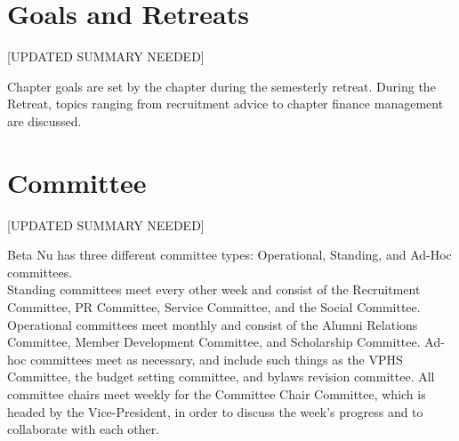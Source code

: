     \section*{Goals and Retreats}
	[UPDATED SUMMARY NEEDED]
	
	Chapter goals are set by the chapter during the semesterly retreat. During the Retreat, topics ranging from recruitment advice to chapter finance management are discussed.
	
    \section*{Committee}
	[UPDATED SUMMARY NEEDED]
    
	Beta Nu has three different committee types: Operational, Standing, and Ad-Hoc committees. \\
	
	Standing committees meet every other week and consist of the Recruitment Committee, PR Committee, Service Committee, and the Social Committee. Operational committees meet monthly and consist of the Alumni Relations Committee, Member Development Committee, and Scholarship Committee. Ad-hoc committees meet as necessary, and include such things as the VPHS Committee, the budget setting committee, and bylaws revision committee. All committee chairs meet weekly for the Committee Chair Committee, which is headed by the Vice-President, in order to discuss the week’s progress and to collaborate with each other.
	
